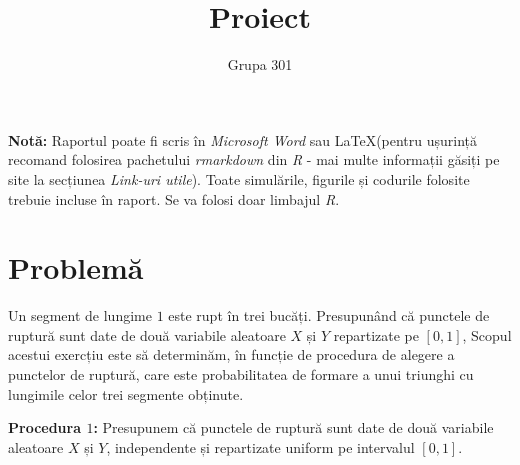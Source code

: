 \documentclass[]{article}
\title{Proiect}
\subtitle{Grupa 301}
\author{}
\date{}
\begin{document}
\maketitle

\thispagestyle{fancy}

\textbf{Notă:} Raportul poate fi scris în \emph{Microsoft Word} sau
\LaTeX (pentru ușurință recomand folosirea pachetului \emph{rmarkdown}
din \emph{R} - mai multe informații găsiți pe site la secțiunea
\emph{Link-uri utile}). Toate simulările, figurile și codurile folosite
trebuie incluse în raport. Se va folosi doar limbajul \emph{R}.

\section{Problemă}\label{problema}

Un segment de lungime \(1\) este rupt în trei bucăți. Presupunând că
punctele de ruptură sunt date de două variabile aleatoare \(X\) și \(Y\)
repartizate pe \([0,1]\), Scopul acestui exercțiu este să determinăm, în
funcție de procedura de alegere a punctelor de ruptură, care este
probabilitatea de formare a unui triunghi cu lungimile celor trei
segmente obținute.

\textbf{Procedura \(1\):} Presupunem că punctele de ruptură sunt date de
două variabile aleatoare \(X\) și \(Y\), independente și repartizate
uniform pe intervalul \([0,1]\).
\end{document}
